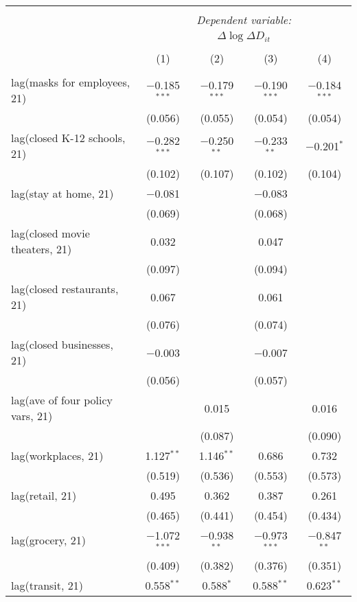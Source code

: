 \begin{tabular}{@{\extracolsep{1pt}}lcccc} 
\\[-1.8ex]\hline 
\hline \\[-1.8ex] 
 & \multicolumn{4}{c}{\textit{Dependent variable:}} \\ 
\cline{2-5} 
 & \multicolumn{4}{c}{$\Delta \log \Delta D_{it}$} \\ 
\\[-1.8ex] & (1) & (2) & (3) & (4)\\ 
\hline \\[-1.8ex] 
 lag(masks for employees, 21) & $-$0.185$^{***}$ & $-$0.179$^{***}$ & $-$0.190$^{***}$ & $-$0.184$^{***}$ \\ 
  & (0.056) & (0.055) & (0.054) & (0.054) \\ 
  lag(closed K-12 schools, 21) & $-$0.282$^{***}$ & $-$0.250$^{**}$ & $-$0.233$^{**}$ & $-$0.201$^{*}$ \\ 
  & (0.102) & (0.107) & (0.102) & (0.104) \\ 
  lag(stay at home, 21) & $-$0.081 &  & $-$0.083 &  \\ 
  & (0.069) &  & (0.068) &  \\ 
  lag(closed movie theaters, 21) & 0.032 &  & 0.047 &  \\ 
  & (0.097) &  & (0.094) &  \\ 
  lag(closed restaurants, 21) & 0.067 &  & 0.061 &  \\ 
  & (0.076) &  & (0.074) &  \\ 
  lag(closed businesses, 21) & $-$0.003 &  & $-$0.007 &  \\ 
  & (0.056) &  & (0.057) &  \\ 
  lag(ave of four policy vars, 21) &  & 0.015 &  & 0.016 \\ 
  &  & (0.087) &  & (0.090) \\ 
  lag(workplaces, 21) & 1.127$^{**}$ & 1.146$^{**}$ & 0.686 & 0.732 \\ 
  & (0.519) & (0.536) & (0.553) & (0.573) \\ 
  lag(retail, 21) & 0.495 & 0.362 & 0.387 & 0.261 \\ 
  & (0.465) & (0.441) & (0.454) & (0.434) \\ 
  lag(grocery, 21) & $-$1.072$^{***}$ & $-$0.938$^{**}$ & $-$0.973$^{***}$ & $-$0.847$^{**}$ \\ 
  & (0.409) & (0.382) & (0.376) & (0.351) \\ 
  lag(transit, 21) & 0.558$^{**}$ & 0.588$^{*}$ & 0.588$^{**}$ & 0.623$^{**}$ \\ 

\end{tabular}
